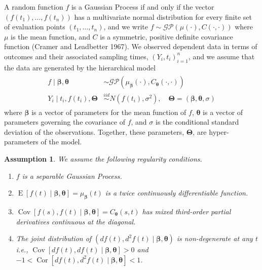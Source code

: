 \documentclass[
  11pt,
]{article}
\newtheorem{assumption}{Assumption}
\theoremstyle{nonumberplain}
\begin{document}
A random function \(f\) is a Gaussian Process if and only if the vector
\((f(t_1), \ldots, f(t_n))\) has a multivariate normal distribution for
every finite set of evaluation points \((t_1, \ldots, t_n)\), and we
write \(f \sim \mathcal{GP}(\mu(\cdot), C(\cdot, \cdot))\) where \(\mu\)
is the mean function, and \(C\) is a symmetric, positive definite
covariance function (Cramer and Leadbetter 1967). We observed dependent
data in terms of outcomes and their associated sampling times,
\((Y_i, t_i)_{i=1}^n\), and we assume that the data are generated by the
hierarchical model \begin{align}
\begin{split}
  f \mid \bm{\beta}, \bm{\theta} &\sim \mathcal{GP}(\mu_{\bm{\beta}}(\cdot), C_{\bm{\theta}}(\cdot,\cdot))\\
  Y_i \mid t_i, f(t_i), \bm{\Theta} &\overset{iid}{\sim} N(f(t_i), \sigma^2), \quad \bm{\Theta} = (\bm{\beta}, \bm{\theta}, \sigma)
\end{split}
\label{eq:generatingProcess}
\end{align} where \(\bm{\beta}\) is a vector of parameters for the mean
function of \(f\), \(\bm{\theta}\) is a vector of parameters governing
the covariance of \(f\), and \(\sigma\) is the conditional standard
deviation of the observations. Together, these parameters,
\(\bm{\Theta}\), are hyper-parameters of the model.

\vspace{0.2cm}

\begin{assumption}
We assume the following regularity conditions.
\begin{enumerate}
  \item[A1:]{$f$ is a separable Gaussian Process.}
  \item[A2:]{$\mathop{\mathrm{E}}[f(t) \mid \bm{\beta}, \bm{\theta}] = \mu_{\bm{\beta}}(t)$ is a twice continuously differentiable function.}
  \item[A3:]{$\mathop{\mathrm{Cov}}[f(s), f(t) \mid \bm{\beta}, \bm{\theta}] = C_{\bm{\theta}}(s,t)$ has mixed third-order partial derivatives continuous at the diagonal.}
  \item[A4:]{The joint distribution of $(df(t), d^2\!f(t) \mid \bm{\beta}, \bm{\theta})$ is non-degenerate at any $t$ i.e., $\mathop{\mathrm{Cov}}[df(t), df(t) \mid \bm{\beta}, \bm{\theta}] > 0$ and $-1 < \mathop{\mathrm{Cor}}[df(t), d^2\!f(t) \mid \bm{\beta}, \bm{\theta}] < 1$.}
\end{enumerate}
\label{assumptions}
\end{assumption}
\end{document}
